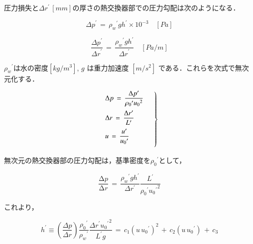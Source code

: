 圧力損失と$\Delta r^{\prime} \,[mm]$の厚さの熱交換器部での圧力勾配は次のようになる．

\begin{equation}
{\Delta p}^{\prime} \,=\, {\rho_{w}}^{\prime} g h^{\prime} \times 10^{-3} \quad [Pa]
\label{eq:coef2_pl}
\end{equation}

\begin{equation}
\frac{{\Delta p}^{\prime}}{{\Delta r}^{\prime}} \,=\,\frac{{\rho_{w}}^{\prime} g h^{\prime}}{{\Delta r}^{\prime}} \quad [Pa/m]
\label{eq:coef3_pl}
\end{equation}

\noindent ${\rho_{w}}^{\prime}$は水の密度$[kg/m^3]$, $g$ は重力加速度 $[m/s^2]$ である．これらを次式で無次元化する．

\begin{equation}
\left.{ 
\begin{array}{l}
\vspace{2mm}
\Delta p \,=\, \displaystyle{ \frac{\Delta p^{\prime}}{{\rho_{0}}^{\prime} {u_{0}}^{2}} }\\
\vspace{2mm}
\displaystyle { \Delta r \,=\, \frac{\Delta r^{\prime}}{L^{\prime}} }\\
\vspace{2mm}
\displaystyle { u \,=\, \frac{u^{\prime}}{{u_{0}}^{\prime}} }
\end{array} \quad }\right\}
\label{eq:coef4_pl}
\end{equation}

\noindent 無次元の熱交換器部の圧力勾配は，基準密度を${\rho_{0}}^{\prime}$として，

\begin{equation}
\frac{\mathrm{\Delta}{p}}{\mathrm{\Delta}{r}}
\,=\,
\frac{ {\rho_{w}}^{\prime} {g} {h}^{\prime}} {\Delta{r}^{\prime}} \frac{L^{\prime}} {{\rho_{0}}^{\prime} {{u_{0}}^{\prime}}^{2}}
\label{eq:coef5_pl}
\end{equation}

\noindent これより，

\begin{equation}
{h}^{\prime} \equiv \left({ \frac{ \Delta p}{ \Delta r} }\right) \frac{{\rho_{0}}^{\prime}}{{\rho_{w}}^{\prime}}\frac{\Delta {r}^{\prime} {{u_{0}}^{\prime}}^{2}} {L^{\prime} g}
\,=\,
c_{1} {\left({ u\, {u_{0}}^{\prime} }\right) }^{2} \,+\, c_{2} \left({ u\, {u_{0}}^{\prime} }\right)  \,+\, c_{3}
\label{eq:coef6_pl}
\end{equation}

